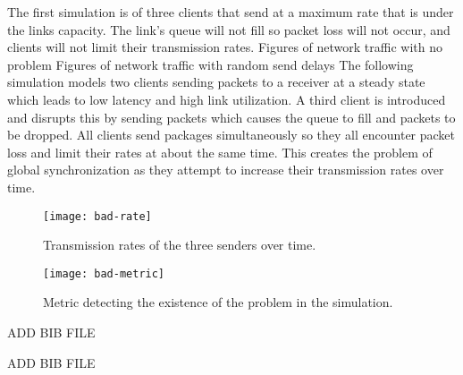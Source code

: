 \documentclass{article}
\begin{document}
	The first simulation is of three clients that send at a maximum rate that is under the links capacity. The link's queue will not fill so packet loss will not occur, and clients will not limit their transmission rates.\newline
																			{ Figures of network traffic with no problem }
																			{ Figures of network traffic with random send delays }
	The following simulation models two clients sending packets to a receiver at a steady state which leads to low latency and high link utilization. A third client is introduced and disrupts this by sending packets which causes the queue to fill and packets to be dropped. All clients send packages simultaneously so they all encounter packet loss and limit their rates at about the same time. This creates the problem of global synchronization as they attempt to increase their transmission rates over time.\newline
	\begin{figure}[H]
		\caption{Transmission rates of the three senders over time.}
		\centering
		\texttt{[image: bad-rate]}
	\end{figure}

	\begin{figure}[H]
		\caption{Metric detecting the existence of the problem in the simulation.}
		\centering
		\texttt{[image: bad-metric]}
	\end{figure}

\begin{thebibliography}{9}
ADD BIB FILE

ADD BIB FILE
\end{thebibliography}
\end{document}
